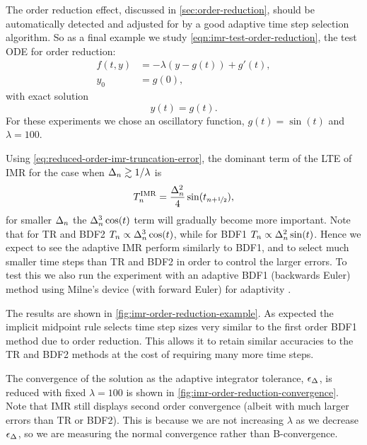 The order reduction effect, discussed in \cref{sec:order-reduction}, should be automatically detected and adjusted for by a good adaptive time step selection algorithm.
So as a final example we study \cref{eqn:imr-test-order-reduction}, the test ODE for order reduction:
\begin{equation}
  \begin{aligned}
    f(t, y) &= -\lambda (y - g(t)) + g'(t), \\
    y_0 &= g(0),
  \end{aligned}
\end{equation}
with exact solution
\begin{equation}
  y(t) = g(t).
\end{equation}
For these experiments we chose an oscillatory function, $g(t) = \sin(t)$ and $\lambda = 100$.

Using \cref{eq:reduced-order-imr-truncation-error}, the dominant term of the LTE of IMR for the case when $\Delta_{n} \gtrsim 1/\lambda$ is
\begin{equation}
  T_n^{\mathrm{IMR}} = \frac{\Delta_{n}^2}{4} \sin(t_{n+\nicefrac{1}{2}}),
\end{equation}
for smaller $\Delta_{n}$ the $\Delta_{n}^3 \cos(t)$ term will gradually become more important.
Note that for TR and BDF2 $T_n \propto \Delta_{n}^3 \cos(t)$, while for BDF1 $T_n \propto \Delta_{n}^2 \sin(t)$.
Hence we expect to see the adaptive IMR perform similarly to BDF1, and to select much smaller time steps than TR and BDF2 in order to control the larger errors.
To test this we also run the experiment with an adaptive BDF1 (backwards Euler) method using Milne's device (with forward Euler) for adaptivity \cite[270]{GreshoSani}.

The results are shown in \cref{fig:imr-order-reduction-example}.
As expected the implicit midpoint rule selects time step sizes very similar to the first order BDF1 method due to order reduction.
This allows it to retain similar accuracies to the TR and BDF2 methods at the cost of requiring many more time steps.

The convergence of the solution as the adaptive integrator tolerance, $\epsilon_{\Delta_{}}$, is reduced with fixed $\lambda = 100$ is shown in \cref{fig:imr-order-reduction-convergence}.
Note that IMR still displays second order convergence (albeit with much larger errors than TR or BDF2).
This is because we are not increasing $\lambda$ as we decrease $\epsilon_{\Delta_{}}$, so we are measuring the normal convergence rather than B-convergence.

\FloatBarrier %


